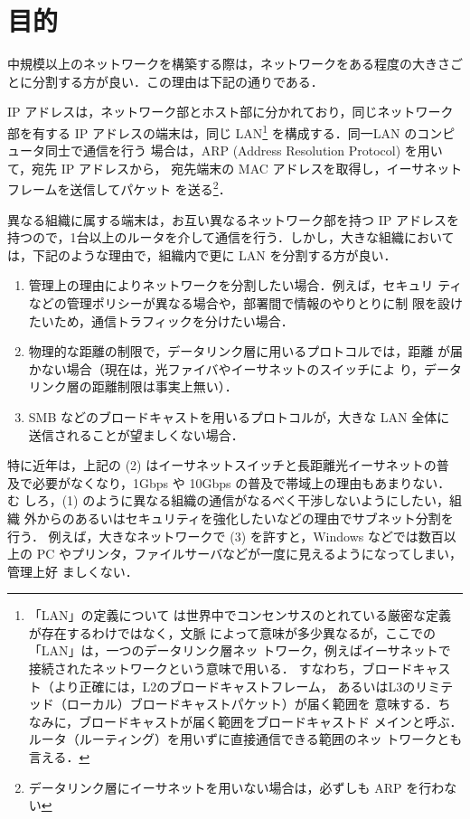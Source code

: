 \section{目的}

中規模以上のネットワークを構築する際は，ネットワークをある程度の大きさご
とに分割する方が良い．この理由は下記の通りである．

IP アドレスは，ネットワーク部とホスト部に分かれており，同じネットワーク
部を有する IP アドレスの端末は，同じ LAN\footnote{「LAN」の定義について
は世界中でコンセンサスのとれている厳密な定義が存在するわけではなく，文脈
によって意味が多少異なるが，ここでの「LAN」は，一つのデータリンク層ネッ
トワーク，例えばイーサネットで接続されたネットワークという意味で用いる．
すなわち，ブロードキャスト（より正確には，L2のブロードキャストフレーム，
あるいはL3のリミテッド（ローカル）ブロードキャストパケット）が届く範囲を
意味する．ちなみに，ブロードキャストが届く範囲をブロードキャストド
メインと呼ぶ．ルータ（ルーティング）を用いずに直接通信できる範囲のネッ
トワークとも言える．} を構成する．同一LAN のコンピュータ同士で通信を行う
場合は，ARP (Address Resolution Protocol) を用いて，宛先 IP アドレスから，
宛先端末の MAC アドレスを取得し，イーサネットフレームを送信してパケット
を送る\footnote{データリンク層にイーサネットを用いない場合は，必ずしも 
ARP を行わない}．

異なる組織に属する端末は，お互い異なるネットワーク部を持つ IP アドレスを
持つので，1台以上のルータを介して通信を行う．しかし，大きな組織において
は，下記のような理由で，組織内で更に LAN を分割する方が良い．
\begin{enumerate}
 \item 管理上の理由によりネットワークを分割したい場合．例えば，セキュリ
       ティなどの管理ポリシーが異なる場合や，部署間で情報のやりとりに制
       限を設けたいため，通信トラフィックを分けたい場合．
 \item 物理的な距離の制限で，データリンク層に用いるプロトコルでは，距離
       が届かない場合（現在は，光ファイバやイーサネットのスイッチによ
       り，データリンク層の距離制限は事実上無い）．
 \item SMB などのブロードキャストを用いるプロトコルが，大きな LAN 全体に
       送信されることが望ましくない場合． 
\end{enumerate}

特に近年は，上記の (2) はイーサネットスイッチと長距離光イーサネットの普
及で必要がなくなり，1Gbps や 10Gbps の普及で帯域上の理由もあまりない．む
しろ，(1) のように異なる組織の通信がなるべく干渉しないようにしたい，組織
外からのあるいはセキュリティを強化したいなどの理由でサブネット分割を行う．
例えば，大きなネットワークで (3) を許すと，Windows などでは数百以上の PC 
やプリンタ，ファイルサーバなどが一度に見えるようになってしまい，管理上好
ましくない．

